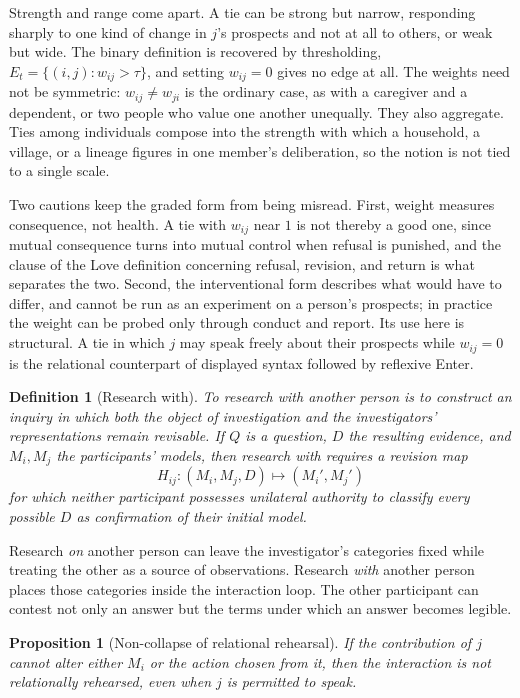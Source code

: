 \documentclass[11pt]{article}
\newtheorem{definition}{Definition}
\newtheorem{proposition}{Proposition}
\theoremstyle{remark}
\begin{document}
Strength and range come apart. A tie can be strong but narrow, responding sharply to one kind of change in $j$'s prospects and not at all to others, or weak but wide. The binary definition is recovered by thresholding, $E_t=\{(i,j):w_{ij}>\tau\}$, and setting $w_{ij}=0$ gives no edge at all. The weights need not be symmetric: $w_{ij}\neq w_{ji}$ is the ordinary case, as with a caregiver and a dependent, or two people who value one another unequally. They also aggregate. Ties among individuals compose into the strength with which a household, a village, or a lineage figures in one member's deliberation, so the notion is not tied to a single scale.

Two cautions keep the graded form from being misread. First, weight measures consequence, not health. A tie with $w_{ij}$ near $1$ is not thereby a good one, since mutual consequence turns into mutual control when refusal is punished, and the clause of the Love definition concerning refusal, revision, and return is what separates the two. Second, the interventional form describes what would have to differ, and cannot be run as an experiment on a person's prospects; in practice the weight can be probed only through conduct and report. Its use here is structural. A tie in which $j$ may speak freely about their prospects while $w_{ij}=0$ is the relational counterpart of displayed syntax followed by reflexive Enter.

\begin{definition}[Research with]
To \emph{research with} another person is to construct an inquiry in which both the object of investigation and the investigators' representations remain revisable. If $Q$ is a question, $D$ the resulting evidence, and $M_i,M_j$ the participants' models, then research with requires a revision map
\[
H_{ij}:(M_i,M_j,D)\longmapsto(M_i',M_j')
\]
for which neither participant possesses unilateral authority to classify every possible $D$ as confirmation of their initial model.
\end{definition}

Research \emph{on} another person can leave the investigator's categories fixed while treating the other as a source of observations. Research \emph{with} another person places those categories inside the interaction loop. The other participant can contest not only an answer but the terms under which an answer becomes legible.

\begin{proposition}[Non-collapse of relational rehearsal]
If the contribution of $j$ cannot alter either $M_i$ or the action chosen from it, then the interaction is not relationally rehearsed, even when $j$ is permitted to speak.
\end{proposition}
\end{document}

